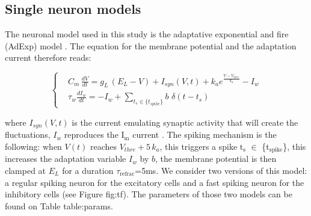 \documentclass[8pt, colorlinks, a4paper]{article}
\renewcommand\ref{}
\begin{document}
\subsection{Single neuron models}
\label{sec-3-1}

The neuronal model used in this study is the adaptative exponential
and fire (AdExp) model \cite{Brette2005a}. The equation for the membrane
potential and the adaptation current therefore reads:

\begin{equation}
\label{eq:iAdExp}
  \left\{
  \begin{split}
  & C_m\,\frac{dV}{dt} = g_{L} \,(E_{L}-V) + I_{syn}(V,t) + k_a e^{\frac{V - V_{thre} }{k_a}}- I_w \\
  & \tau_w \frac{d I_w}{dt} = - I_w + \sum_{t_s \in \{t_{spike}\}} b \, \, \delta (t-t_s)
  \end{split}
\right.
\end{equation}

where $I_{syn}(V, t)$ is the current emulating synaptic activity that
will create the fluctuations, $I_w$ reproduces the I$_{\text{m}}$ current
\cite{McCormick1985}. The spiking mechanism is the following: when
$V(t)$ reaches \(V_{thre}+5 \, k_a \), this triggers a spike t$_{\text{s}}$ $\in$
\{t$_{\text{spike}}$\}, this increases the adaptation variable $I_w$ by \(b\),
the membrane potential is then clamped at \(E_L\) for a duration
$\tau$$_{\text{refrac}}$=5ms. We consider two versions of this model: a regular
spiking neuron for the excitatory cells and a fast spiking neuron for
the inhibitory cells (see Figure \ref{fig:tf}). The parameters of those two
models can be found on Table \ref{table:params}.
\end{document}
